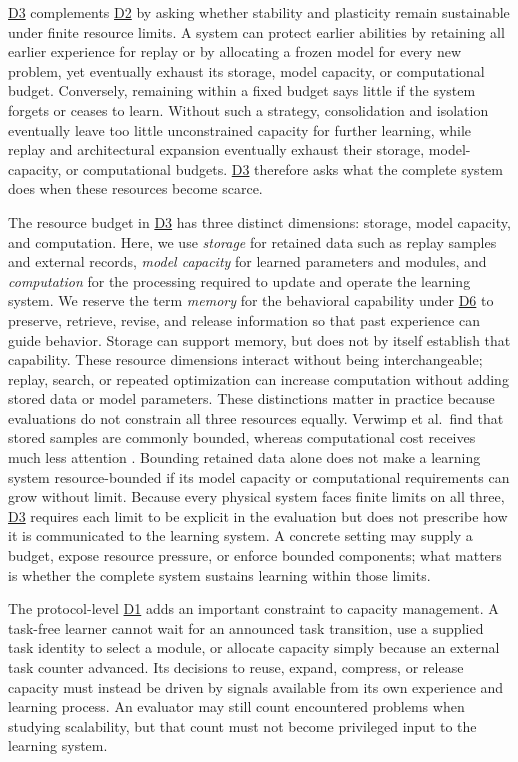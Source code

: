 \documentclass[10pt,journal,compsoc]{IEEEtran}
\DeclareRobustCommand{\Dref}[1]{\hyperref[sec:d#1]{D#1}}
\begin{document}
\Dref{3} complements \Dref{2} by asking whether stability and plasticity remain sustainable under finite resource limits.
A system can protect earlier abilities by retaining all earlier experience for replay or by allocating a frozen model for every new problem, yet eventually exhaust its storage, model capacity, or computational budget.
Conversely, remaining within a fixed budget says little if the system forgets or ceases to learn.
Without such a strategy, consolidation and isolation eventually leave too little unconstrained capacity for further learning, while replay and architectural expansion eventually exhaust their storage, model-capacity, or computational budgets.
\Dref{3} therefore asks what the complete system does when these resources become scarce.

The resource budget in \Dref{3} has three distinct dimensions: storage, model capacity, and computation.
Here, we use \emph{storage} for retained data such as replay samples and external records, \emph{model capacity} for learned parameters and modules, and \emph{computation} for the processing required to update and operate the learning system.
We reserve the term \emph{memory} for the behavioral capability under \Dref{6} to preserve, retrieve, revise, and release information so that past experience can guide behavior.
Storage can support memory, but does not by itself establish that capability.
These resource dimensions interact without being interchangeable; replay, search, or repeated optimization can increase computation without adding stored data or model parameters.
These distinctions matter in practice because evaluations do not constrain all three resources equally.
Verwimp et al.\ find that stored samples are commonly bounded, whereas computational cost receives much less attention \cite{verwimp2024}.
Bounding retained data alone does not make a learning system resource-bounded if its model capacity or computational requirements can grow without limit.
Because every physical system faces finite limits on all three, \Dref{3} requires each limit to be explicit in the evaluation but does not prescribe how it is communicated to the learning system.
A concrete setting may supply a budget, expose resource pressure, or enforce bounded components; what matters is whether the complete system sustains learning within those limits.

The protocol-level \Dref{1} adds an important constraint to capacity management.
A task-free learner cannot wait for an announced task transition, use a supplied task identity to select a module, or allocate capacity simply because an external task counter advanced.
Its decisions to reuse, expand, compress, or release capacity must instead be driven by signals available from its own experience and learning process.
An evaluator may still count encountered problems when studying scalability, but that count must not become privileged input to the learning system.
\end{document}
